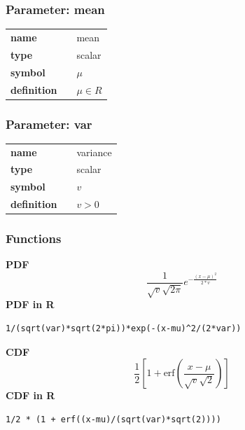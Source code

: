 \subsubsection*{Parameter: mean}

\noindent\begin{tabular}{p{2cm}cl}
\textbf{name} & & mean \\
\textbf{type} & & scalar \\
\textbf{symbol} & & $\mu$  \\
\textbf{definition} & & $\mu \in R$
\end{tabular}
\subsubsection*{Parameter: var}

\noindent\begin{tabular}{p{2cm}cl}
\textbf{name} & & variance \\
\textbf{type} & & scalar \\
\textbf{symbol} & & $v$  \\
\textbf{definition} & & $v>0$
\end{tabular}
\subsubsection*{Functions}

\smallskip \noindent \hspace{.2cm} \textbf{PDF} 
\begin{equation*}\frac{1}{\sqrt{v} \sqrt{2 \pi}}e^{-\frac{(x-\mu)^2}{2*v}}\end{equation*}
\smallskip \noindent \hspace{.2cm} \textbf{PDF in R}  
\begin{verbatim}1/(sqrt(var)*sqrt(2*pi))*exp(-(x-mu)^2/(2*var))\end{verbatim}
\smallskip \noindent \hspace{.2cm} \textbf{CDF} 
\begin{equation*}\frac12\left[1 + \text{erf}\left( \frac{x-\mu}{\sqrt{v}\sqrt{2}}\right)\right]\end{equation*}
\smallskip \noindent \hspace{.2cm} \textbf{CDF in R} 
\begin{verbatim}1/2 * (1 + erf((x-mu)/(sqrt(var)*sqrt(2))))\end{verbatim}
\smallskip
